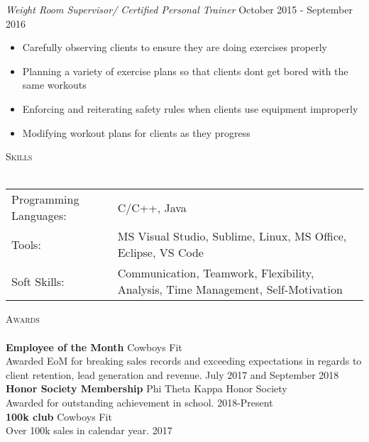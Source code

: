 \documentclass[a4paper]{article}
\newcommand{\lineunder} {
    \vspace*{-8pt} \\
    \hspace*{-18pt} \hrulefill \\
}
\newcommand{\header} [1] {
    {\hspace*{-18pt}\vspace*{6pt} \textsc{#1}}
    \vspace*{-6pt} \lineunder
}
\begin{document}
\textit{Weight Room Supervisor/ Certified Personal Trainer} \hfill October 2015 - September 2016\\
\vspace{-1mm}
\begin{itemize} \itemsep 1pt
	\item Carefully observing clients to ensure they are doing exercises properly
	\item Planning a variety of exercise plans so that clients don\textquotesingle{}t get bored with the same workouts
	\item Enforcing and reiterating safety rules when clients use equipment improperly
	\item Modifying workout plans for clients as they progress
\end{itemize}

\header{Skills}
\begin{tabular}{ l l }
	Programming Languages: & C/C++, Java                                                                      \\
	Tools:                 & MS Visual Studio, Sublime, Linux, MS Office, Eclipse, VS Code                    \\
	Soft Skills:           & Communication, Teamwork, Flexibility, Analysis, Time Management, Self-Motivation \\
\end{tabular}
\vspace{2mm}



\header{Awards}
\textbf{Employee of the Month} \hfill Cowboys Fit\\
Awarded EoM for breaking sales records and exceeding expectations in regards to client retention, lead generation and revenue. \hfill July 2017 and September 2018\\
\vspace*{2mm}
\textbf{Honor Society Membership} \hfill Phi Theta Kappa Honor Society\\
Awarded for outstanding achievement in school. \hfill 2018-Present\\
\vspace*{2mm}
\textbf{100k club} \hfill Cowboys Fit\\
Over 100k sales in calendar year. \hfill 2017\\
\vspace*{2mm}

\ 
\end{document}
